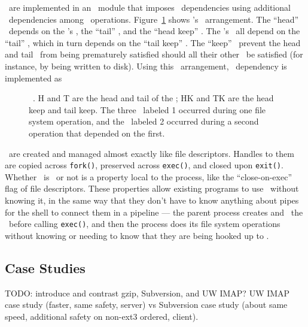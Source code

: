 \Opgroups\ are implemented in an \LFS\ module that imposes \opgroup\
dependencies using additional \chdesc\ dependencies among \LFS\
operations.
%
Figure~\ref{fig:opgroup-chdescs} shows \anopgroup's \chdesc\ arrangement.
%
The ``head'' \chdesc\ depends on the \opgroup's \chdescs, the ``tail''
\chdesc, and the ``head keep'' \chdesc.
%
The \opgroup's \chdescs\ all depend on the ``tail'' \chdesc, which in
turn depends on the ``tail keep'' \chdesc.
%
The ``keep'' \chdescs\ prevent the head and tail \chdescs\ from being
prematurely satisfied should all their other \befores\ be satisfied
(for instance, by being written to disk).
%
Using this \chdesc\ arrangement, \anopgroup\ dependency 
is implemented as 

\begin{figure}[htb]
\caption{\label{fig:opgroup-chdescs} \Opgroup\ \chdescs. H and T are the head
and tail of the \opgroup; HK and TK are the head keep and tail keep. The three
\chdescs\ labeled 1 occurred during one file system operation, and the \chdesc\
labeled 2 occurred during a second operation that depended on the first.}
\end{figure}

\Opgroups\ are created and managed almost exactly like file descriptors. Handles
to them are copied across \texttt{fork()}, preserved across \texttt{exec()}, and
closed upon \texttt{exit()}. Whether \anopgroup\ is \engaged\ or not is a
property local to the process, like the ``close-on-exec'' flag of file
descriptors. These properties allow existing programs to use \opgroups\ without
knowing it, in the same way that they don't have to know anything about pipes
for the shell to connect them in a pipeline --- the parent process creates and
\engages\ the \opgroups\ before calling \texttt{exec()}, and then the process
does its file system operations without knowing or needing to know that they are
being hooked up to \anopgroup.

\subsection{Case Studies}
\label{sec:opgroup:casestudies}

TODO: introduce and contrast gzip, Subversion, and UW IMAP?
%
UW IMAP case study (faster, same safety, server) vs
Subversion case study (about same speed, additional safety on non-ext3
ordered, client).

